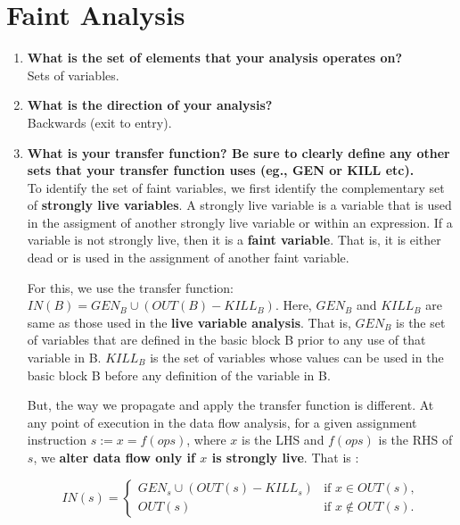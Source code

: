 \section{Faint Analysis}

\begin{enumerate}
\item \textbf{What is the set of elements that your analysis operates on?} \\

  Sets of variables.

\item \textbf{What is the direction of your analysis?} \\

  Backwards (exit to entry).

\item \textbf{What is your transfer function? Be sure to clearly define any other sets that your transfer function uses (eg., GEN or KILL etc).} \\

  To identify the set of faint variables, we first identify the complementary set of \textbf{strongly live variables}.
  A strongly live variable is a variable that is used in the assigment of another strongly live variable or within an expression.
  If a variable is not strongly live, then it is a \textbf{faint variable}.
  That is, it is either dead or is used in the assignment of another faint variable.

  For this, we use the transfer function: $IN(B) = GEN_B \cup (OUT(B)-KILL_B)$.
  Here, $GEN_B$ and $KILL_B$ are same as those used in the \textbf{live variable analysis}.
  That is,
  \textbf{$GEN_B$} is the set of variables that are defined in the basic block B prior to any use of that variable in B.
  \textbf{$KILL_B$} is the set of variables whose values can be used in the basic block B before any definition of the variable in B.

  But, the way we propagate and apply the transfer function is different.
  At any point of execution in the data flow analysis, for a given assignment instruction $s:=  x = f(ops)$, where $x$ is the LHS and $f(ops)$ is the RHS of $s$,
  we \textbf{alter data flow only if $x$ is strongly live}. That is :

\[
IN(s) = \left\{ 
\begin{array}{ll}
GEN_s \cup (OUT(s)-KILL_s) & \mbox{if } x \in OUT(s),\\
OUT(s) & \mbox{if } x \notin OUT(s).
\end{array}
\right.
\]


\end{enumerate}
